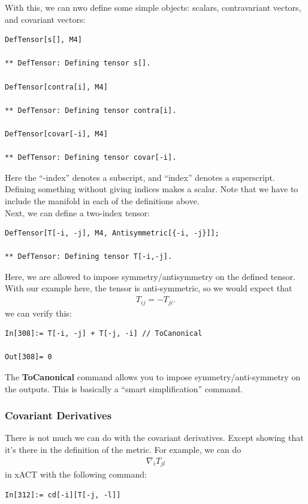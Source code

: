 \documentclass{book}
\theoremstyle{definition}
\begin{document}
With this, we can nwo define some simple objects: scalars, contravariant vectors, and covariant vectors:
\begin{lstlisting}
DefTensor[s[], M4]

** DefTensor: Defining tensor s[]. 

DefTensor[contra[i], M4]

** DefTensor: Defining tensor contra[i]. 

DefTensor[covar[-i], M4]

** DefTensor: Defining tensor covar[-i]. 
\end{lstlisting}
Here the ``-index'' denotes a subscript, and ``index'' denotes a superscript. Defining something without giving indices makes a scalar. Note that we have to include the manifold in each of the definitions above. \\

Next, we can define a two-index tensor:
\begin{lstlisting}
DefTensor[T[-i, -j], M4, Antisymmetric[{-i, -j}]];

** DefTensor: Defining tensor T[-i,-j]. 
\end{lstlisting}

Here, we are allowed to impose symmetry/antisymmetry on the defined tensor. With our example here, the tensor is anti-symmetric, so we would expect that
\begin{align}
T_{ij} = -T_{ji}.
\end{align}
we can verify this:
\begin{lstlisting}
In[308]:= T[-i, -j] + T[-j, -i] // ToCanonical

Out[308]= 0
\end{lstlisting}

The \textbf{ToCanonical} command allows you to impose symmetry/anti-symmetry on the outputs. This is basically a ``smart simplification'' command. 




\subsubsection{Covariant Derivatives}

There is not much we can do with the covariant derivatives. Except showing that it's there in the definition of the metric. For example, we can do
\begin{align}
\nabla_i T_{jl}
\end{align}
in xACT with the following command:
\begin{lstlisting}
In[312]:= cd[-i][T[-j, -l]]
\end{lstlisting}
\end{document}
